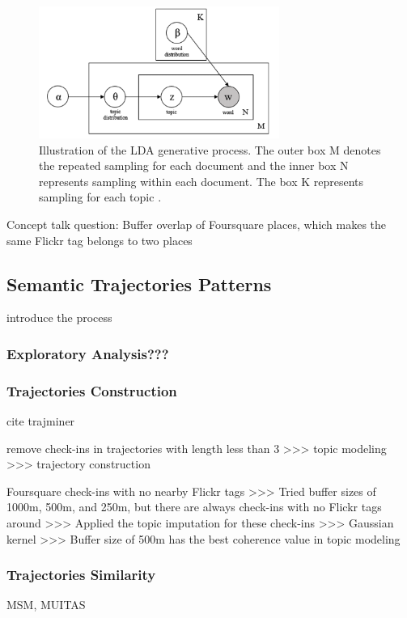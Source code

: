 \documentclass{article}
\begin{document}
\begin{figure}
\centering
\includegraphics[width=0.7\textwidth]{figures/lda.png}
\caption{\label{fig:lda}Illustration of the LDA generative process. The outer box M denotes the repeated sampling for each document and the inner box N represents sampling within each document. The box K represents sampling for each topic \citep{vayansky_review_2020}.}
\end{figure}


Concept talk question: Buffer overlap of Foursquare places, which makes the same Flickr tag belongs to two places



\subsection{Semantic Trajectories Patterns}
introduce the process
\cite{alvares_model_2007}

\subsubsection{Exploratory Analysis???}

\subsubsection{Trajectories Construction}
cite trajminer

remove check-ins in trajectories with length less than 3 >>> topic modeling >>> trajectory construction

Foursquare check-ins with no nearby Flickr tags >>>
Tried buffer sizes of 1000m, 500m, and 250m, but there are always check-ins with no Flickr tags around >>>
Applied the topic imputation for these check-ins >>>
Gaussian kernel >>>
Buffer size of 500m has the best coherence value in topic modeling

\subsubsection{Trajectories Similarity}
MSM, MUITAS
\end{document}

